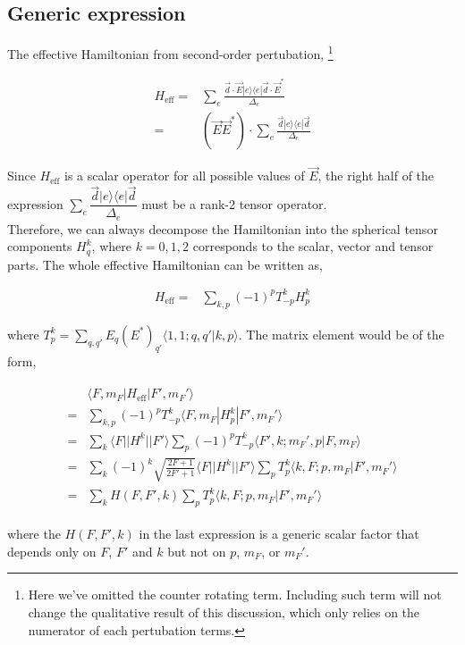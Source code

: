 \documentclass[10pt,fleqn]{article}
\newcommand{\dsum}{\displaystyle\sum}
\newcommand{\eqar}[1]
{
  \begin{align}
    #1
  \end{align}
}
\newcommand{\paren}[1]{{\left({#1}\right)}}
\begin{document}
\subsection{Generic expression}
The effective Hamiltonian from second-order pertubation,
\footnote{Here we've omitted the counter rotating term.
  Including such term will not change the qualitative result of this discussion,
  which only relies on the numerator of each pertubation terms.}
\eqar{
  H_{\mathrm{eff}}=&\sum_{e}\frac{\vec d\cdot\vec E|e\rangle\langle e|\vec d\cdot\vec E^*}{\Delta_e}\\
  =&\paren{\vec E\vec E^*}\cdot\sum_{e}\frac{\vec d|e\rangle\langle e|\vec d}{\Delta_e}
}
Since $H_{\mathrm{eff}}$ is a scalar operator for all possible values of $\vec E$,
the right half of the expression $\sum_{e}\dfrac{\vec d|e\rangle\langle e|\vec d}{\Delta_e}$ must be a rank-2 tensor operator.\\

Therefore, we can always decompose the Hamiltonian into the spherical tensor components
$H^k_q$, where $k=0,1,2$ corresponds to the scalar, vector and tensor parts.
The whole effective Hamiltonian can be written as,
\eqar{
  H_{\mathrm{eff}}=&\sum_{k,p}(-1)^p T^k_{-p}H^k_p
}
where $T^k_p=\dsum_{q,q'}E_q(E^*)_{q'}\langle 1,1;q,q'|k,p\rangle$.
The matrix element would be of the form,
\eqar{
  \begin{split}
    &\langle F,m_F|H_{\mathrm{eff}}|F',m_F'\rangle\\
    =&\sum_{k,p}(-1)^p T^k_{-p}\langle F,m_F|H^k_p|F',m_F'\rangle\\
    =&\sum_{k}\langle F||H^k||F'\rangle\sum_{p}(-1)^p T^k_{-p}
       \langle F',k;m_F',p|F,m_F\rangle\\
    =&\sum_{k}(-1)^{k}\sqrt{\frac{2F+1}{2F'+1}}\langle F||H^k||F'\rangle
       \sum_{p}T^k_{p}\langle k,F;p,m_F|F',m_F'\rangle\\
    =&\sum_{k}H(F,F',k)\sum_{p}T^k_{p}\langle k,F;p,m_F|F',m_F'\rangle
  \end{split}
}
where the $H(F,F',k)$ in the last expression is a generic scalar factor
that depends only on $F$, $F'$ and $k$ but not on $p$, $m_F$, or $m_F'$.

\end{document}

